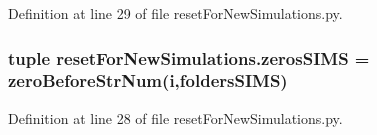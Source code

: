Definition at line 29 of file reset\-For\-New\-Simulations.\-py.

\hypertarget{namespacereset_for_new_simulations_a067f416fc59f243e38a0b8a40627979b}{
\subsubsection[{zeros\-S\-I\-M\-S}]{\setlength{\rightskip}{0pt plus 5cm}tuple reset\-For\-New\-Simulations.\-zeros\-S\-I\-M\-S = {\bf zero\-Before\-Str\-Num}({\bf i},{\bf folders\-S\-I\-M\-S})}}\label{namespacereset_for_new_simulations_a067f416fc59f243e38a0b8a40627979b}


Definition at line 28 of file reset\-For\-New\-Simulations.\-py.


